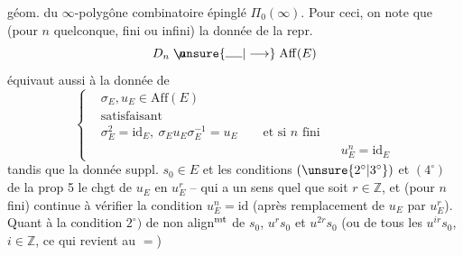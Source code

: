 géom. du $\infty$-polygône combinatoire épinglé $\Pi_0(\infty)$. Pour ceci, on note que   (pour $n$ quelconque, fini ou infini) la donnée de la repr.
\[
D_n\mathrel{\makebox[0pt][l]{\makebox[1.35em]{$\rho$}}\unsure{\rule{1.35em}{0.4pt}|\longrightarrow}}\mathrm{Aff}(E)
\]
équivaut aussi à la donnée de
\[
\left\{\begin{aligned}
&\sigma_E,u_E\in\mathrm{Aff}(E)\\
&\text{satisfaisant}\\
&\sigma_E^2= \mathrm{id}_E,\ \sigma_Eu_E\sigma_E^{-1}=u_E
\qquad\text{et si $n$ fini}\\[-2pt]
&\hspace{19em}u_E^n=\mathrm{id}_E
\end{aligned}\right.\tag*{(28)}
\]
tandis que la donnée suppl. $s_0\in E$ et les conditions $(\unsure{2^\circ|3^\circ})$ et $(4^\circ)$  de la prop 5    le chgt de $u_E$ en $u_E^r$ -- qui a un sens quel que soit $r\in\mathbb Z$, et (pour $n$ fini) continue à vérifier la condition $u_E^n=\mathrm{id}$ (après remplacement de $u_E$ par $u_E^r$).  Quant à la condition $2^\circ)$ de non align$^{\rm mt}$ de $s_0$, $u^rs_0$ et $u^{2r}s_0$ (ou de tous les $u^{ir}s_0$, $i\in\mathbb Z$, ce qui revient au $=$)
